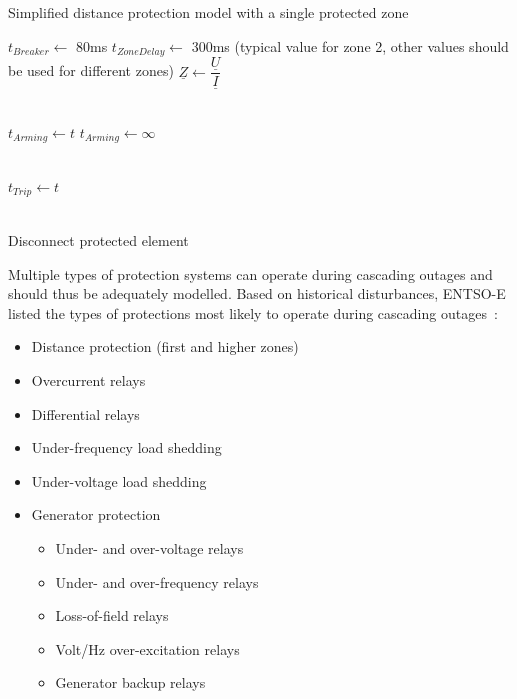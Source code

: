 \begin{algorithm}
\centering
\caption{Simplified distance protection model with a single protected zone}\label{alg:distance}
\begin{algorithmic}[1]
\State \(t_{Breaker} \gets\) 80ms
\State \(t_{ZoneDelay} \gets\) 300ms (typical value for zone 2, other values should be used for different zones)
\State \(\underline{Z} \gets \dfrac{\underline{U}}{\underline{I}}\)

\\
    \State \(t_{Arming} \gets t\)
    \State \(t_{Arming} \gets \infty\)
\EndIf

\\
    \State \(t_{Trip} \gets t\)
\EndIf

\\
    \State Disconnect protected element
\EndIf

\end{algorithmic}
\end{algorithm}

Multiple types of protection systems can operate during cascading outages and should thus be adequately modelled. Based on historical disturbances, ENTSO-E listed the types of protections most likely to operate during cascading outages~\cite{ENTSOEdefencePlan}:

\begin{itemize}
    \item Distance protection (first and higher zones)
    \item Overcurrent relays
    \item Differential relays
    \item Under-frequency load shedding
    \item Under-voltage load shedding
    \item Generator protection
    \begin{itemize}
        \item Under- and over-voltage relays
        \item Under- and over-frequency relays
        \item Loss-of-field relays
        \item Volt/Hz over-excitation relays
        \item Generator backup relays
    \end{itemize}
\end{itemize}

